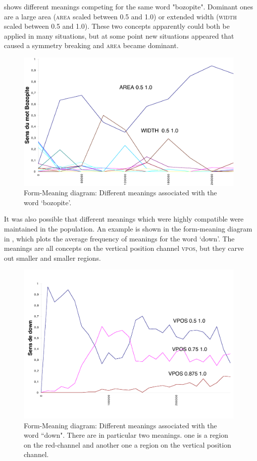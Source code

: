  shows different meanings competing for the same word "bozopite". Dominant ones are 
a large area (\textsc{area} scaled between 0.5 and 1.0) or extended width (\textsc{width} scaled between 0.5 and 1.0). These two concepts
apparently could both be applied in many situations, but at some point new situations appeared that 
caused a symmetry breaking and \textsc{area} became dominant. 

\begin{figure}[htbp]
  \centerline{\includegraphics[width=\textwidth]{chap8/figures/bozopite.pdf}}
\caption{\label{fig:bozopite}Form-Meaning diagram: Different meanings associated with the word `bozopite'. 
}
\end{figure}

It was also possible that different meanings which were highly compatible were maintained in the population. 
An example is shown in the form-meaning diagram in , which plots the average 
frequency of meanings for the word `down'. The meanings are all concepts on the vertical position channel 
\textsc{vpos}, but they carve out smaller and smaller regions. 

\begin{figure}[htbp]
  \centerline{\includegraphics[width=.65\textwidth]{chap8/figures/down.pdf}}
\caption{\label{fig:down}Form-Meaning diagram: Different meanings associated with the word ``down". There are in particular two meanings. 
one is a region on the red-channel and another one a region on the vertical position channel. 
}
\end{figure}

